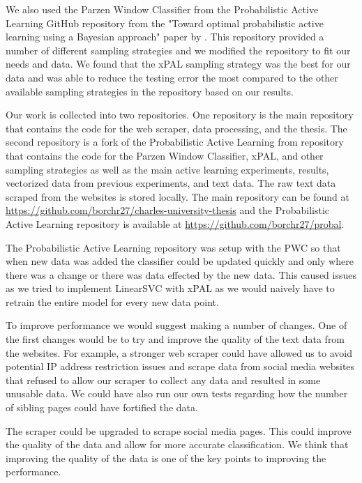 We also used the Parzen Window Classifier from the Probabilistic Active Learning GitHub repository from the "Toward optimal probabilistic active learning using a Bayesian approach" paper by \cite{kottke2021toward}. This repository provided a number of different sampling strategies and we modified the repository to fit our needs and data. We found that the xPAL sampling strategy was the best for our data and was able to reduce the testing error the most compared to the other available sampling strategies in the repository based on our results.

Our work is collected into two repositories. One repository is the main repository that contains the code for the web scraper, data processing, and the thesis. The second repository is a fork of the Probabilistic Active Learning from \cite{kottke2021toward} repository that contains the code for the Parzen Window Classifier, xPAL, and other sampling strategies as well as the main active learning experiments, results, vectorized data from previous experiments, and text data. The raw text data scraped from the websites is stored locally. The main repository can be found at \url{https://github.com/borchr27/charles-university-thesis} and the Probabilistic Active Learning repository is available at \url{https://github.com/borchr27/probal}.

The Probabilistic Active Learning repository was setup with the PWC so that when new data was added the classifier could be updated quickly and only where there was a change or there was data effected by the new data. This caused issues as we tried to implement LinearSVC with xPAL as we would naively have to retrain the entire model for every new data point.

To improve performance we would suggest making a number of changes. One of the first changes would be to try and improve the quality of the text data from the websites. For example, a stronger web scraper could have allowed us to avoid potential IP address restriction issues and scrape data from social media websites that refused to allow our scraper to collect any data and resulted in some unusable data. We could have also run our own tests regarding how the number of sibling pages could have fortified the data.

The scraper could be upgraded to scrape social media pages. This could improve the quality of the data and allow for more accurate classification. We think that improving the quality of the data is one of the key points to improving the performance.


